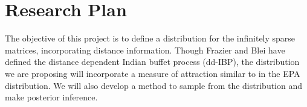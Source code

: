 \chapter{Research Plan}%

The objective of this project is to define a distribution for the infinitely
sparse matrices, incorporating distance information. Though Frazier and Blei
have defined the distance dependent Indian buffet process (dd-IBP), the 
distribution we are proposing will incorporate a measure of attraction similar
to in the EPA distribution. We will also develop a method to sample from the
distribution and make posterior inference. \\


